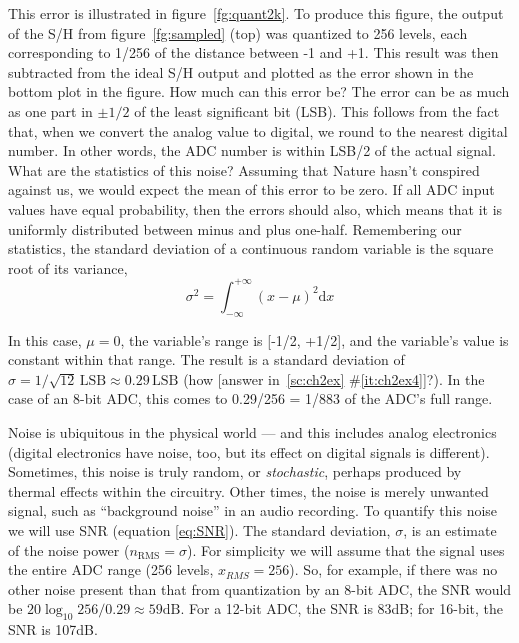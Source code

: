 This error is illustrated in figure~\ref{fg:quant2k}. To produce this
figure, the output of the S/H from figure~\ref{fg:sampled} (top) was
quantized to 256 levels, each corresponding to 1/256 of the distance
between -1 and +1. This result was then subtracted from the ideal S/H
output and plotted as the error shown in the bottom plot in the
figure. How much can this error be? The error can be as much as one
part in $\pm 1/2$ of the least significant bit (LSB). This follows
from the fact that, when we convert the analog value to digital, we
round to the nearest digital number. In other words, the ADC number is
within LSB/2 of the actual signal. What are the statistics of this
noise? Assuming that Nature hasn't conspired against us, we would
expect the mean of this error to be zero.  If all ADC input values
have equal probability, then the errors should also, which means that
it is uniformly distributed between minus and plus one-half.
Remembering our statistics, the standard deviation of a continuous
random variable is the square root of its variance,
\begin{equation}
\sigma^2 = \int_{-\infty}^{+\infty} (x-\mu)^2 \mathrm{d}x
\label{eq:var}
\end{equation}

In this case, $\mu=0$, the variable's range is [-1/2, +1/2], and the
variable's value is constant within that range. The result is a
standard deviation of $\sigma = 1/\sqrt{12} \, \mathrm{LSB} \approx
0.29 \, \mathrm{LSB}$ (how [answer in~\ref{sc:ch2ex}
\#\ref{it:ch2ex4}]?). In the case of an 8-bit ADC, this comes to
0.29/256 = 1/883 of the ADC's full range.

Noise is ubiquitous in the physical world --- and this includes
analog electronics (digital electronics have noise, too, but its
effect on digital signals is different). Sometimes, this noise is
truly random, or \emph{stochastic}, perhaps produced by thermal
effects within the circuitry. Other times, the noise is merely
unwanted signal, such as ``background noise'' in an audio recording.
To quantify this noise we will use SNR (equation \ref{eq:SNR}). The standard deviation, $\sigma$, is an estimate of the noise power ($n_\mathrm{RMS}=\sigma$). For simplicity we will assume that the signal uses the entire ADC range (256 levels, $x_{RMS}=256$).
So, for example, if there was no other noise
present than that from quantization by an 8-bit ADC, the SNR would be
$20 \log_{10} 256/0.29 \approx 59\mathrm{dB}$. For a 12-bit ADC, the SNR is
83dB; for 16-bit, the SNR is 107dB.

